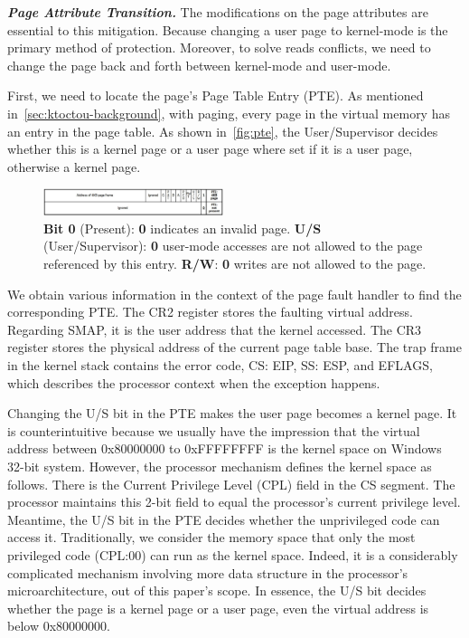 \textbf{\textit{Page Attribute Transition.}}  The modifications on the page attributes are essential to this mitigation. Because changing a user page to kernel-mode is the primary method of protection.  Moreover, to solve reads conflicts, we need to change the page back and forth between kernel-mode and user-mode.

First, we need to locate the page's Page Table Entry (PTE). As mentioned in~\autoref{sec:ktoctou-background}, with paging, every page in the virtual memory has an entry in the page table.  As shown in~\autoref{fig:pte}, the User/Supervisor decides whether this is a kernel page or a user page where set if it is a user page, otherwise a kernel page.

\begin{figure}[th]
  \includegraphics[width=0.47\textwidth]{figures/pte2}
  \centering
  \caption{\textbf{Bit 0} (Present): \textbf{0} indicates an invalid page. \textbf{U/S} (User/Supervisor): \textbf{0} user-mode accesses are not allowed to the page referenced by this entry. \textbf{R/W}: \textbf{0} writes are not allowed to the page.}
  \label{fig:pte}
\end{figure}



We obtain various information in the context of the page fault handler to find the corresponding PTE. The CR2 register stores the faulting virtual address. Regarding SMAP, it is the user address that the kernel accessed. The CR3 register stores the physical address of the current page table base. The trap frame in the kernel stack contains the error code, CS: EIP, SS: ESP, and EFLAGS, which describes the processor context when the exception happens.

Changing the U/S bit in the PTE makes the user page becomes a kernel page. It is counterintuitive because we usually have the impression that the virtual address between 0x80000000 to 0xFFFFFFFF is the kernel space on Windows 32-bit system. However, the processor mechanism defines the kernel space as follows. There is the Current Privilege Level (CPL) field in the CS segment. The processor maintains this 2-bit field to equal the processor's current privilege level. Meantime, the U/S bit in the PTE decides whether the unprivileged code can access it. Traditionally, we consider the memory space that only the most privileged code (CPL:00) can run as the kernel space. Indeed, it is a considerably complicated mechanism involving more data structure in the processor's microarchitecture, out of this paper's scope. In essence, the U/S bit decides whether the page is a kernel page or a user page, even the virtual address is below 0x80000000.


